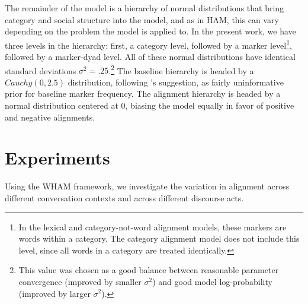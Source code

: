 \documentclass[11pt]{article}
\begin{document}
The remainder of the model is a hierarchy of normal distributions that bring category and social structure into the model, and as in HAM, this can vary depending on the problem the model is applied to.  In the present work, we have three levels in the hierarchy: first, a category level, followed by a marker level\footnote{In the lexical and category-not-word alignment models, these markers are words within a category. The category alignment model does not include this level, since all words in a category are treated identically.}, followed by a marker-dyad level. All of these normal distributions have identical standard deviations $\sigma^2=.25$.\footnote{This value was chosen as a good balance between reasonable parameter convergence (improved by smaller $\sigma^2$) and good model log-probability (improved by larger $\sigma^2$).}  The baseline hierarchy is headed by a $Cauchy(0,2.5)$ distribution, following \cite{GelmanEtAl2008}'s suggestion, as fairly uninformative prior for baseline marker frequency. The alignment hierarchy is headed by a normal distribution centered at 0, biasing the model equally in favor of positive and negative alignments.



\section{Experiments}

Using the WHAM framework, we investigate the variation in alignment across different conversation contexts and across different discourse acts.
\end{document}
